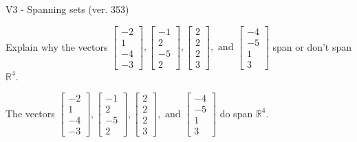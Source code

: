 \begin{exercise}
  \begin{exerciseTitle}V3 - Spanning sets (ver. 353)\end{exerciseTitle}
  \begin{exerciseStatement}
    Explain why the vectors \(\left[\begin{array}{r}
-2 \\
1 \\
-4 \\
-3
\end{array}\right] , \left[\begin{array}{r}
-1 \\
2 \\
-5 \\
2
\end{array}\right] , \left[\begin{array}{r}
2 \\
2 \\
2 \\
3
\end{array}\right] , \text{ and } \left[\begin{array}{r}
-4 \\
-5 \\
1 \\
3
\end{array}\right]\) span or don't span \(\mathbb{R}^4\). 
	


  \end{exerciseStatement}
  \begin{exerciseAnswer}
   The vectors \(\left[\begin{array}{r}
-2 \\
1 \\
-4 \\
-3
\end{array}\right] , \left[\begin{array}{r}
-1 \\
2 \\
-5 \\
2
\end{array}\right] , \left[\begin{array}{r}
2 \\
2 \\
2 \\
3
\end{array}\right] , \text{ and } \left[\begin{array}{r}
-4 \\
-5 \\
1 \\
3
\end{array}\right]\) 
  	 do  
	span \(\mathbb{R}^4\).
  


  \end{exerciseAnswer}
\end{exercise}
